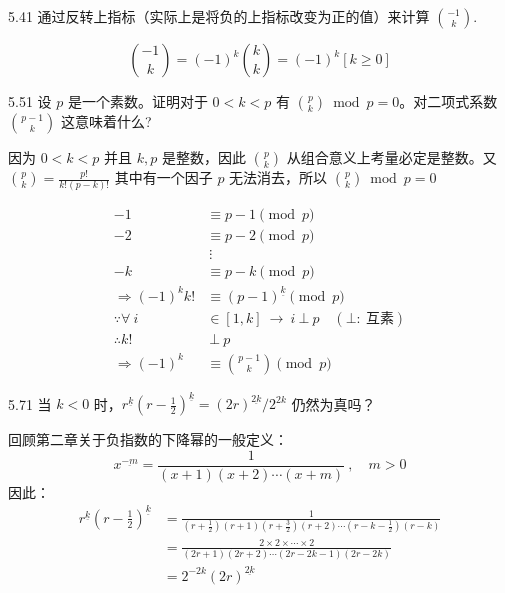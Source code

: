 \begin{problem}{5.4}{1}
  通过反转上指标（实际上是将负的上指标改变为正的值）来计算 \( \binom{-1}{k} \).
\end{problem}

\[
  \binom{-1}{k} = (-1)^k \binom{k}{k} = (-1)^k [k \ge 0]
\]

\begin{problem}{5.5}{1}
  设 \( p \) 是一个素数。证明对于 \( 0 < k < p \) 有 \( \binom{p}{k} \bmod p = 0 \)。对二项式系数 \( \binom{p-1}{k} \) 这意味着什么?
\end{problem}

因为 \( 0 < k < p \) 并且 \( k, p \) 是整数，因此 \( \binom{p}{k} \) 从组合意义上考量必定是整数。又 \( \binom{p}{k} = \frac{p!}{k! (p-k)!} \) 其中有一个因子 \( p \) 无法消去，所以 \( \binom{p}{k} \bmod p = 0 \)

\begin{align*}
  -1 & \equiv p-1 \pmod{p} \\
  -2 & \equiv p-2 \pmod{p} \\
  & \ \vdots \\
  -k & \equiv p-k \pmod{p} \\[5pt]
  \Rightarrow (-1)^k k! & \equiv (p-1)^{\underline{k}} \pmod{p} \\[5pt]
  \because \forall \ i & \in [1, k] \ \rightarrow \ i \ \bot \ p \quad ( \bot : \ \text{互素}) \\
  \therefore k! & \ \bot\  p \\[5pt]
  \Rightarrow (-1)^k & \equiv \binom{p-1}{k} \pmod{p}
\end{align*}

\begin{problem}{5.7}{1}
  当 \( k < 0 \) 时，\( r^{\underline{k}} (r - \frac{1}{2})^{\underline{k}} = (2r)^{\underline{2k}} / 2^{2k} \) 仍然为真吗？
\end{problem}

回顾第二章关于负指数的下降幂的一般定义：
\[
  x^{\underline{-m}} = \frac{1}{(x+1)(x+2) \cdots (x+m)} \ , \quad m > 0
\]
因此：
\begin{align*}
  r^{\underline{k}} (r - \frac{1}{2})^{\underline{k}} &= \frac{1}{(r+\frac{1}{2})(r+1)(r+\frac{3}{2})(r+2) \cdots (r-k-\frac{1}{2})(r-k)} \\[6pt]
  &= \frac{2 \times 2 \times \cdots \times 2}{(2r+1) (2r+2) \cdots (2r-2k-1)(2r-2k)} \\[6pt]
  &= 2^{-2k} (2r)^{\underline{2k}}
\end{align*}

